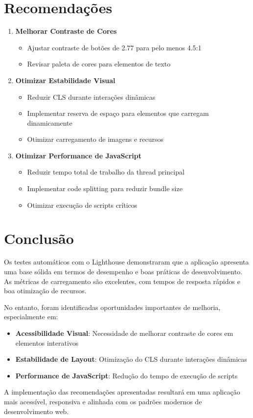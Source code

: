 \section{Recomendações}

\begin{enumerate}
    \item \textbf{Melhorar Contraste de Cores}
    \begin{itemize}
        \item Ajustar contraste de botões de 2.77 para pelo menos 4.5:1
        \item Revisar paleta de cores para elementos de texto
    \end{itemize}
    
    \item \textbf{Otimizar Estabilidade Visual}
    \begin{itemize}
        \item Reduzir CLS durante interações dinâmicas
        \item Implementar reserva de espaço para elementos que carregam dinamicamente
        \item Otimizar carregamento de imagens e recursos
    \end{itemize}
    
    \item \textbf{Otimizar Performance de JavaScript}
    \begin{itemize}
        \item Reduzir tempo total de trabalho da thread principal
        \item Implementar code splitting para reduzir bundle size
        \item Otimizar execução de scripts críticos
    \end{itemize}
\end{enumerate}

\section{Conclusão}

Os testes automáticos com o Lighthouse demonstraram que a aplicação apresenta uma base sólida em termos de desempenho e boas práticas de desenvolvimento. As métricas de carregamento são excelentes, com tempos de resposta rápidos e boa otimização de recursos.

No entanto, foram identificadas oportunidades importantes de melhoria, especialmente em:

\begin{itemize}
    \item \textbf{Acessibilidade Visual}: Necessidade de melhorar contraste de cores em elementos interativos
    \item \textbf{Estabilidade de Layout}: Otimização do CLS durante interações dinâmicas
    \item \textbf{Performance de JavaScript}: Redução do tempo de execução de scripts
\end{itemize}

A implementação das recomendações apresentadas resultará em uma aplicação mais acessível, responsiva e alinhada com os padrões modernos de desenvolvimento web.
